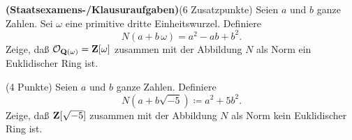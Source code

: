 \documentclass{algsheet}
\begin{document}
\begin{exercise}\textbf{(Staatsexamens-/Klausuraufgaben)}(6 Zusatzpunkte)\newline
  Seien \(a\) und \(b\) ganze Zahlen. Sei \(\omega\) eine primitive dritte Einheitswurzel.
  Definiere
  \begin{equation}
    N(a + b \, \omega) = a^2 - ab + b^2.
  \end{equation}
  Zeige, daß \(\mathcal O_{\mathbf Q(\omega)} = \mathbf Z[\omega]\) zusammen mit der
  Abbildung \(N\) als Norm ein Euklidischer Ring ist.
\end{exercise}

\begin{exercise}(4 Punkte)\newline
  Seien \(a\) und \(b\) ganze Zahlen. Definiere
  \begin{equation}
    N(a + b \sqrt{-5}) \coloneqq a^2 + 5 b^2.
  \end{equation}
  Zeige, daß \(\mathbf Z[\sqrt{-5}]\) zusammen mit der Abbildung \(N\) als Norm
  kein Euklidischer Ring ist.
\end{exercise}
\end{document}
